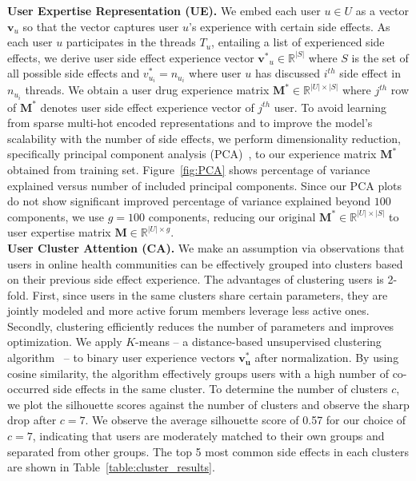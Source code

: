 \documentclass{bmcart}
\begin{document}
\textbf{User Expertise Representation (UE).}  We embed each user $u
\in U$ as a vector $\boldsymbol{v}_{u}$ so that the vector captures
user $u$'s experience with certain side effects. As each user $u$
participates in the threads $T_u$, entailing a list of experienced
side effects, we derive user side effect experience vector $\boldsymbol{v^{\ast}}_{u}
\in \mathbb{R}^{|S|}$ where $S$ is the set of all possible side effects and
$v^{\ast}_{u_i}=n_{u_i}$ where user $u$ has discussed $i^{th}$ side effect in $n_{u_i}$ threads. We obtain a user drug experience matrix
$\boldsymbol{M}^{\ast} \in \mathbb{R}^{|U|\times|S|}$ where $j^{th}$
row of $\boldsymbol{M}^{\ast}$ denotes user side effect experience vector of $j^{th}$ user. To avoid learning from sparse multi-hot encoded representations and to improve the model's scalability with the number of side effects, we perform  dimensionality reduction, specifically principal component analysis (PCA)~\cite{jolliffe1986principal}, to our experience matrix $\boldsymbol{M}^{\ast}$ obtained from training set.
Figure~\ref{fig:PCA} shows percentage of variance explained versus
number of included principal components. Since our PCA plots do not show significant improved percentage of variance explained beyond $100$ components, we use $g=100$ components, reducing
our original $\boldsymbol{M}^{\ast}\in \mathbb{R}^{|U|\times|S|}$ to
user expertise matrix $\boldsymbol{M} \in \mathbb{R}^{|U| \times g}$. \\

\textbf{User Cluster Attention (CA).} We make an assumption via observations that users in online health communities can be effectively grouped into clusters based on their previous side effect experience. The advantages of clustering users is 2-fold. First, since users in the same clusters share certain parameters, they are jointly modeled and more active forum members leverage less active ones. Secondly, clustering efficiently reduces the number of parameters and improves optimization. We apply $K$-means -- a distance-based unsupervised clustering algorithm~\cite{MacQueen67} -- to binary user experience vectors $\boldsymbol{v^*_u}$ after normalization. 
By using cosine similarity, 
the algorithm effectively groups users with a high number of co-occurred side effects in the same cluster. To determine the number of clusters $c$, we plot the silhouette scores against the number of clusters and %
observe the sharp drop after $c=7$. 
We observe the average silhouette score of 0.57 for our choice of $c=7$, indicating that users are moderately matched to their own groups and separated from other groups. The top 5 most common side effects in each clusters are shown in Table~\ref{table:cluster_results}.
\end{document}
